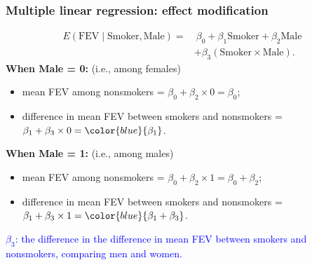 \documentclass[12pt, 
hyperref={colorlinks=true, linkcolor=blue, urlcolor=cyan}]{beamer}
\begin{document}
\begin{frame}
\frametitle{Multiple linear regression: effect modification}
\vspace{-0.7cm}
\begin{align*}
E(\text{FEV} \mid \text{Smoker}, \text{Male}) = & \ \beta_0 + \beta_1 \text{Smoker} + \beta_2 \text{Male}\\
& + \beta_3 (\text{Smoker} \times \text{Male}).
\end{align*}
\vspace{-0.3cm}
\textbf{When Male = 0:}  (i.e., among females) \vspace{-0.2cm}
\begin{itemize}
\item mean FEV among nonsmokers = $\beta_0 + \beta_2 \times 0 = \beta_0$; 
\item difference in mean FEV between smokers and nonsmokers = $\beta_1 + \beta_3 \times 0 = \color{blue}{\beta_1}$.
\end{itemize}

\textbf{When Male = 1:}  (i.e., among males) \vspace{-0.2cm}
\begin{itemize}
\item mean FEV among nonsmokers = $\beta_0 + \beta_2 \times 1 = \beta_0 + \beta_2$; 
\item difference in mean FEV between smokers and nonsmokers = $\beta_1 + \beta_3 \times 1 = \color{blue}{\beta_1 + \beta_3}$.
\end{itemize}

\textcolor{blue}{$\beta_3$: the difference in the difference in mean FEV between smokers and nonsmokers, comparing men and women.}
\end{frame}
\end{document}
